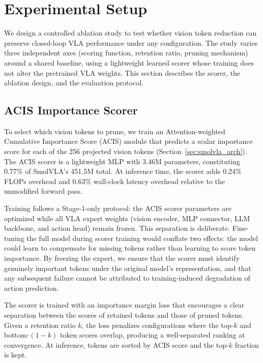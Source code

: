 
\section{Experimental Setup}
\label{sec:experimental_setup}

We design a controlled ablation study to test whether vision token reduction can preserve closed-loop VLA performance under any configuration. The study varies three independent axes (scoring function, retention ratio, pruning mechanism) around a shared baseline, using a lightweight learned scorer whose training does not alter the pretrained VLA weights. This section describes the scorer, the ablation design, and the evaluation protocol.

\subsection{ACIS Importance Scorer}
\label{sec:acis_scorer}

To select which vision tokens to prune, we train an Attention-weighted Cumulative Importance Score (ACIS) module that predicts a scalar importance score for each of the 256 projected vision tokens (Section~\ref{sec:smolvla_arch}). The ACIS scorer is a lightweight MLP with 3.46M parameters, constituting 0.77\% of SmolVLA's 451.5M total. At inference time, the scorer adds 0.24\% FLOPs overhead and 0.63\% wall-clock latency overhead relative to the unmodified forward pass.

Training follows a Stage-1-only protocol: the ACIS scorer parameters are optimized while all VLA expert weights (vision encoder, MLP connector, LLM backbone, and action head) remain frozen. This separation is deliberate. Fine-tuning the full model during scorer training would conflate two effects: the model could learn to compensate for missing tokens rather than learning to score token importance. By freezing the expert, we ensure that the scorer must identify genuinely important tokens under the original model's representation, and that any subsequent failure cannot be attributed to training-induced degradation of action prediction.

The scorer is trained with an importance margin loss that encourages a clear separation between the scores of retained tokens and those of pruned tokens. Given a retention ratio $k$, the loss penalizes configurations where the top-$k$ and bottom-$(1{-}k)$ token scores overlap, producing a well-separated ranking at convergence. At inference, tokens are sorted by ACIS score and the top-$k$ fraction is kept.

